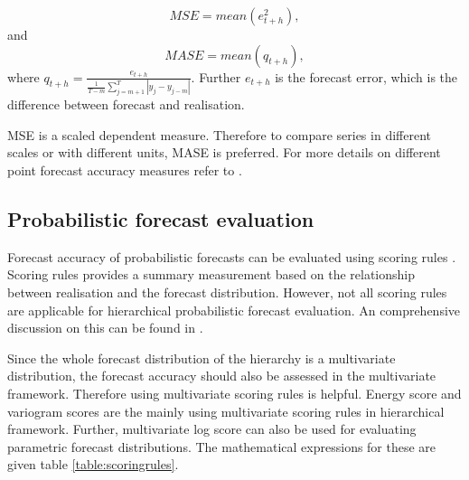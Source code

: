 \documentclass[graybox]{svmult}
\begin{document}
\begin{equation}\label{eq:22}
MSE = mean(e^2_{t+h}),
\end{equation}
and
\begin{equation}\label{eq:23}
 MASE = mean(q_{t+h}),
\end{equation}
where $q_{t+h} = \frac{e_{t+h}}{\frac{1}{T-m}\sum_{j=m+1}^{T}|y_j - y_{j-m}|}$. Further $e_{t+h}$ is the forecast error, which is the difference between forecast and realisation.

MSE is a scaled dependent measure. Therefore to compare series in different scales or with different units, MASE is preferred. For more details on different point forecast accuracy measures refer to \cite{hyndman2018forecasting}.

\subsection{Probabilistic forecast evaluation}

Forecast accuracy of probabilistic forecasts can be evaluated using scoring rules \cite{Gneiting2014}. Scoring rules provides a summary measurement based on the relationship between realisation and the forecast distribution. However, not all scoring rules are applicable for hierarchical probabilistic forecast evaluation. An comprehensive discussion on this can be found in \cite{Gamakumara2018}.

Since the whole forecast distribution of the hierarchy is a multivariate distribution, the forecast accuracy should also be assessed in the multivariate framework. Therefore using multivariate scoring rules is helpful. Energy score \citep{Gneiting2008} and variogram scores \citep{SCHEUERER2015} are the mainly using multivariate scoring rules in hierarchical framework. Further, multivariate log score \citep{Gneiting2007} can also be used for evaluating parametric forecast distributions. The mathematical expressions for these are given table \ref{table:scoringrules}.
\end{document}
